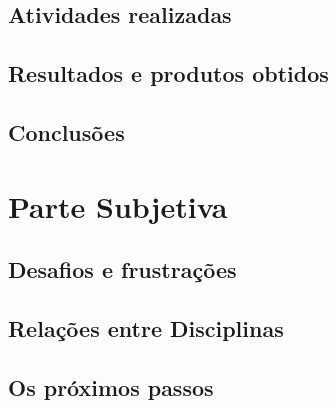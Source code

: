 \documentclass[a4paper,10pt]{article}
\begin{document}
   \subsection{Atividades realizadas}
	
   \subsection{Resultados e produtos obtidos}
   \subsection{Conclusões}

   
  \section{Parte Subjetiva}
  \subsection{Desafios e frustrações}
  \subsection{Relações entre Disciplinas}
  \subsection{Os próximos passos}
  
   
  
\end{document}
